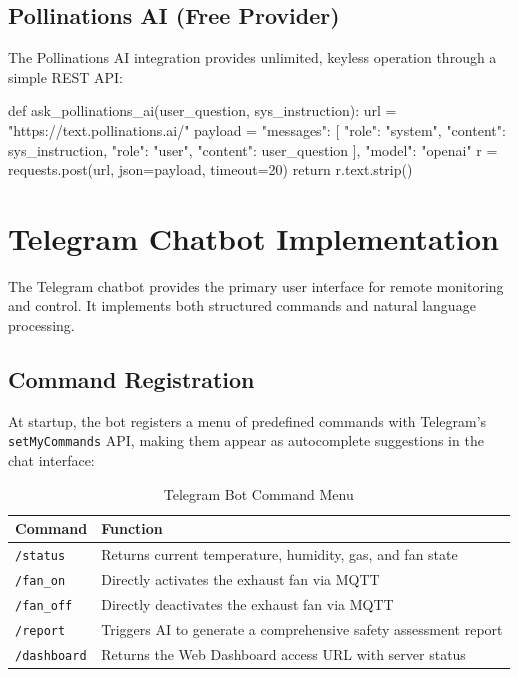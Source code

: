 \documentclass[12pt,a4paper]{report}
\begin{document}
\subsection{Pollinations AI (Free Provider)}
The Pollinations AI integration provides unlimited, keyless operation through a simple REST API:

\begin{codebox}[Python]
def ask_pollinations_ai(user_question, sys_instruction):
    url = "https://text.pollinations.ai/"
    payload = {
        "messages": [
            {"role": "system", "content": sys_instruction},
            {"role": "user", "content": user_question}
        ],
        "model": "openai"
    }
    r = requests.post(url, json=payload, timeout=20)
    return r.text.strip()
\end{codebox}

\section{Telegram Chatbot Implementation}
The Telegram chatbot provides the primary user interface for remote monitoring and control. It implements both structured commands and natural language processing.

\subsection{Command Registration}
At startup, the bot registers a menu of predefined commands with Telegram's \texttt{setMyCommands} API, making them appear as autocomplete suggestions in the chat interface:

\begin{table}[H]
    \centering
    \begin{tabular}{|l|p{8cm}|}
        \hline
        \textbf{Command} & \textbf{Function} \\ \hline
        \texttt{/status} & Returns current temperature, humidity, gas, and fan state \\ \hline
        \texttt{/fan\_on} & Directly activates the exhaust fan via MQTT \\ \hline
        \texttt{/fan\_off} & Directly deactivates the exhaust fan via MQTT \\ \hline
        \texttt{/report} & Triggers AI to generate a comprehensive safety assessment report \\ \hline
        \texttt{/dashboard} & Returns the Web Dashboard access URL with server status \\ \hline
    \end{tabular}
    \caption{Telegram Bot Command Menu}
    \label{tab:telegram_commands}
\end{table}
\end{document}
